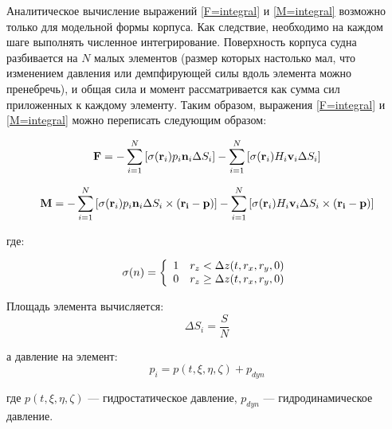 Аналитическое вычисление выражений \eqref{F=integral} и \eqref{M=integral} возможно только для модельной формы корпуса. Как следствие, необходимо на каждом шаге выполнять численное интегрирование. Поверхность корпуса судна разбивается на $N$ малых элементов (размер которых настолько мал, что изменением давления или демпфирующей силы вдоль элемента можно пренебречь), и общая сила и момент рассматривается как сумма сил приложенных к каждому элементу. Таким образом, выражения \eqref{F=integral} и \eqref{M=integral} можно переписать следующим образом:

\begin{equation}
	\mathbf{F} = 
		-\sum_{i=1}^{N} \left[
			\sigma (\mathbf{r}_i) p_i \mathbf{n}_i \Delta S_i
		\right]
		-\sum_{i=1}^{N} \left[
			\sigma (\mathbf{r}_i) H_i \mathbf{v}_i \Delta S_i
		\right]
\end{equation}

\begin{equation}
	\mathbf{M} = 
		-\sum_{i=1}^{N} \left[
			\sigma (\mathbf{r}_i) p_i \mathbf{n}_i \Delta S_i \times (\mathbf{r_i} - \mathbf{p})
		\right]
		-\sum_{i=1}^{N} \left[
			\sigma (\mathbf{r}_i) H_i \mathbf{v}_i \Delta S_i \times (\mathbf{r_i} - \mathbf{p})
		\right]
\end{equation}

где:

\begin{equation}
  \sigma(n) = \left\{
  \begin{array}{l l}
    1 & r_z		< 		\Delta z (t, r_x, r_y, 0) \\
    0 & r_z		\geq 	\Delta z (t, r_x, r_y, 0) \\
  \end{array} \right.
\end{equation}

Площадь элемента вычисляется:
\begin{equation}
	\Delta S_i = \frac{S}{N}
\end{equation}

а давление на элемент:
\begin{equation}
	p_i = p(t, \xi, \eta, \zeta) + p_{dyn}
\end{equation}

где $p(t, \xi, \eta, \zeta)$ --- гидростатическое давление, $p_{dyn}$ --- гидродинамическое давление.


